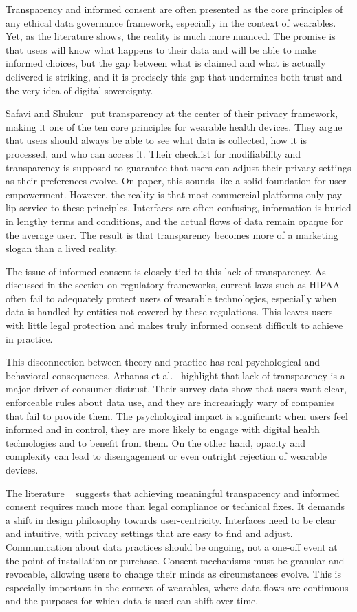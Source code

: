 	Transparency and informed consent are often presented as the core principles of any ethical data governance framework, especially in the context of wearables. Yet, as the literature shows, the reality is much more nuanced. The promise is that users will know what happens to their data and will be able to make informed choices, but the gap between what is claimed and what is actually delivered is striking, and it is precisely this gap that undermines both trust and the very idea of digital sovereignty.

	Safavi and Shukur~\cite{Safavi2014} put transparency at the center of their privacy framework, making it one of the ten core principles for wearable health devices. They argue that users should always be able to see what data is collected, how it is processed, and who can access it. Their checklist for modifiability and transparency is supposed to guarantee that users can adjust their privacy settings as their preferences evolve. On paper, this sounds like a solid foundation for user empowerment. However, the reality is that most commercial platforms only pay lip service to these principles. Interfaces are often confusing, information is buried in lengthy terms and conditions, and the actual flows of data remain opaque for the average user. The result is that transparency becomes more of a marketing slogan than a lived reality.

	The issue of informed consent is closely tied to this lack of transparency. As discussed in the section on regulatory frameworks, current laws such as HIPAA often fail to adequately protect users of wearable technologies, especially when data is handled by entities not covered by these regulations. This leaves users with little legal protection and makes truly informed consent difficult to achieve in practice.

	This disconnection between theory and practice has real psychological and behavioral consequences. Arbanas et al.~\cite{Arbanas2023} highlight that lack of transparency is a major driver of consumer distrust. Their survey data show that users want clear, enforceable rules about data use, and they are increasingly wary of companies that fail to provide them. The psychological impact is significant: when users feel informed and in control, they are more likely to engage with digital health technologies and to benefit from them. On the other hand, opacity and complexity can lead to disengagement or even outright rejection of wearable devices.

	The literature ~\cite{Safavi2014} suggests that achieving meaningful transparency and informed consent requires much more than legal compliance or technical fixes. It demands a shift in design philosophy towards user-centricity. Interfaces need to be clear and intuitive, with privacy settings that are easy to find and adjust. Communication about data practices should be ongoing, not a one-off event at the point of installation or purchase. Consent mechanisms must be granular and revocable, allowing users to change their minds as circumstances evolve. This is especially important in the context of wearables, where data flows are continuous and the purposes for which data is used can shift over time.

